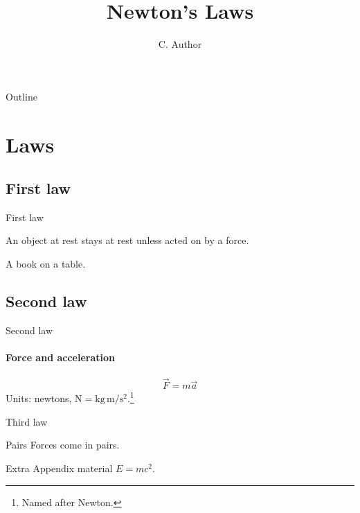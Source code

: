\documentclass[aspectratio=169]{beamer}
\title{Newton's Laws}
\author{C. Author}
\institute{Physics Department}
\begin{document}
\frame{\titlepage}
\begin{frame}{Outline}\tableofcontents\end{frame}
\section{Laws}
\subsection{First law}
\begin{frame}{First law}
  \begin{definition}
    An object at rest stays at rest unless acted on by a force.
  \end{definition}
  \begin{example}
    A book on a table.
  \end{example}
\end{frame}
\subsection{Second law}
\begin{frame}{Second law}
  \framesubtitle{Force and acceleration}
  \[ \vec{F} = m \vec{a} \]
  Units: newtons, $\mathrm{N} = \mathrm{kg\,m/s^2}$.\footnote{Named after Newton.}
\end{frame}
\begin{frame}{Third law}
  \begin{exampleblock}{Pairs}
    Forces come in pairs.
  \end{exampleblock}
\end{frame}
\appendix
\begin{frame}{Extra}
  Appendix material $E = mc^2$.
\end{frame}
\end{document}
